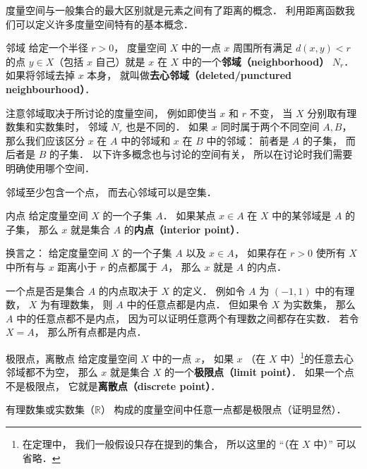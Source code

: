 
度量空间与一般集合的最大区别就是元素之间有了距离的概念． 利用距离函数我们可以定义许多度量空间特有的基本概念．

\begin{definition}{邻域}
给定一个半径 $r > 0$， 度量空间 $X$ 中的一点 $x$ 周围所有满足 $d(x, y) < r$ 的点 $y \in X$（包括 $x$ 自己）就是 $x$ 在 $X$ 中的一个\textbf{邻域（neighborhood）} $N_r$． 如果将邻域去掉 $x$ 本身， 就叫做\textbf{去心邻域（deleted/punctured neighbourhood）}．
\end{definition}
注意邻域取决于所讨论的度量空间， 例如即使当 $x$ 和 $r$ 不变， 当 $X$ 分别取有理数集和实数集时， 邻域 $N_r$ 也是不同的． 如果 $x$ 同时属于两个不同空间 $A, B$， 那么我们应该区分 $x$ 在 $A$ 中的邻域和 $x$ 在 $B$ 中的邻域： 前者是 $A$ 的子集， 而后者是 $B$ 的子集． 以下许多概念也与讨论的空间有关， 所以在讨论时我们需要明确使用哪个空间．

邻域至少包含一个点， 而去心邻域可以是空集．

\begin{definition}{内点}\label{Metri2_def2}
给定度量空间 $X$ 的一个子集 $A$． 如果某点 $x\in A$ 在 $X$ 中的某邻域是 $A$ 的子集， 那么 $x$ 就是集合 $A$ 的\textbf{内点（interior point）}．

换言之： 给定度量空间 $X$ 的一个子集 $A$ 以及 $x \in A$， 如果存在 $r > 0$ 使所有 $X$ 中所有与 $x$ 距离小于 $r$ 的点都属于 $A$， 那么 $x$ 就是 $A$ 的内点．
\end{definition}

\begin{example}{}\label{Metri2_ex1}
一个点是否是集合 $A$ 的内点取决于 $X$ 的定义． 例如令 $A$ 为 $(-1, 1)$ 中的有理数， $X$ 为有理数集， 则 $A$ 中的任意点都是内点． 但如果令 $X$ 为实数集， 那么 $A$ 中的任意点都不是内点， 因为可以证明任意两个有理数之间都存在实数．%
若令 $X = A$， 那么所有点都是内点．
\end{example}

\begin{definition}{极限点，离散点}\label{Metri2_def3}
给定度量空间 $X$ 中的一点 $x$， 如果 $x$ （在 $X$ 中）\footnote{在定理中， 我们一般假设只存在提到的集合， 所以这里的 “（在 $X$ 中）” 可以省略．}的任意去心邻域都不为空， 那么 $x$ 就是集合 $X$ 的一个\textbf{极限点（limit point）}． 如果一个点不是极限点， 它就是\textbf{离散点（discrete point）}．
\end{definition}
\begin{example}{}\label{Metri2_ex2}
有理数集或实数集（$\mathbb R$） 构成的度量空间中任意一点都是极限点（证明显然）．
\end{example}

